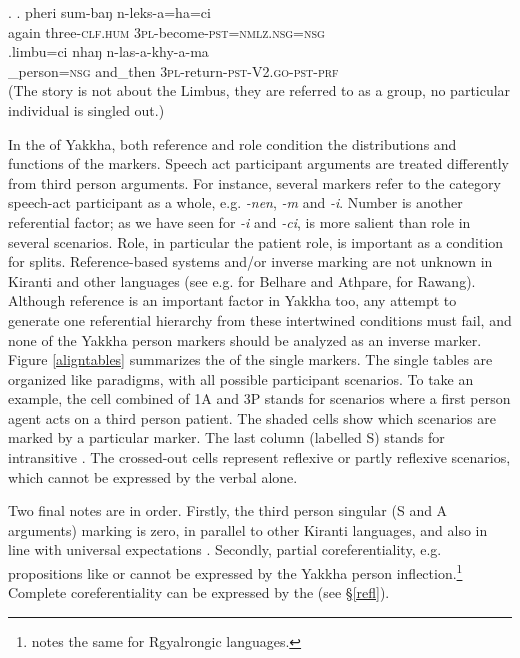 \ex. \ag.           pheri sum-baŋ       n-leks-a=ha=ci\\
again three{\scshape -clf.hum} {\scshape 3pl-}become{\scshape -pst=nmlz.nsg=nsg}\\
 
\bg.limbu=ci nhaŋ n-las-a-khy-a-ma\\
\_person{\scshape =nsg} and\_then {\scshape 3pl-}return{\scshape -pst-V2.go-pst-prf}\\
 (The story is not about the Limbus, they are referred to as  a group, no particular individual is singled out.) 


In the  of Yakkha, both reference and role condition the distributions and functions of the markers. Speech act participant arguments are treated differently from third person arguments. For instance, several markers refer to the category speech-act participant as a whole, e.g. \emph{-nen}, \emph{-m} and \emph{-i}. Number is another referential factor; as we have seen for \emph{-i} and \emph{-ci},  is more salient than role in several scenarios. Role, in particular the patient role, is important as a condition for  splits. 
Reference-based systems and/or inverse marking are not unknown in Kiranti and other  languages  (see e.g. \citet{Ebert1991Inverse} for Belhare and Athpare, \citet{LaPolla2007Hierarchical} for Rawang). Although reference is an important factor in Yakkha too, any attempt to generate one referential hierarchy from these intertwined conditions must  fail, and none of the Yakkha person markers should be analyzed as an inverse marker. Figure \ref{aligntables} summarizes  the  of the single markers. The single tables are organized like paradigms, with all possible participant scenarios. To take an example, the cell combined of 1A and 3P stands for scenarios where a first person agent acts on a third person patient. The shaded cells show which  scenarios are marked by a particular marker. The last column (labelled S) stands for intransitive . The crossed-out cells represent reflexive or partly reflexive scenarios, which cannot be expressed by the verbal  alone.

Two final notes are in order. Firstly, the third person singular (S and A arguments) marking is zero, in parallel to other Kiranti languages, and also in line with universal expectations \citep{Siewierska2008_Person}. Secondly, partial coreferentiality, e.g. propositions like  or  cannot be expressed by the Yakkha person inflection.\footnote{\citet{Jacques2012_Agreement} notes the same for Rgyalrongic languages.}  Complete coreferentiality can be expressed by the   (see  §\ref{refl}).


